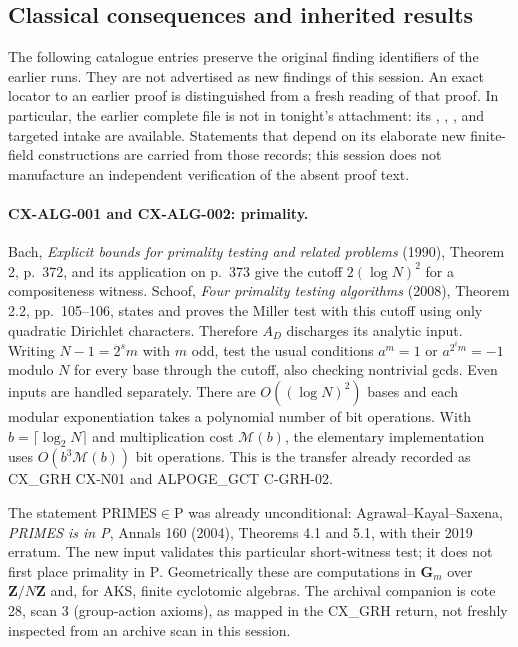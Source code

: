 \documentclass[11pt,a4paper]{article}
\begin{document}
\subsection{Classical consequences and inherited results}

The following catalogue entries preserve the original finding identifiers of
the earlier runs. They are not advertised as new findings of this session.
An exact locator to an earlier proof is distinguished from a fresh reading of
that proof. In particular, the earlier complete file  is
not in tonight's attachment: its , ,
, and targeted intake are available. Statements that depend
on its elaborate new finite-field constructions are carried from those records;
this session does not manufacture an independent verification of the absent
proof text.

\paragraph{CX-ALG-001 and CX-ALG-002: primality.}
Bach, \emph{Explicit bounds for primality testing and related problems}
(1990), Theorem 2, p.~372, and its application on p.~373 give the cutoff
$2(\log N)^2$ for a compositeness witness. Schoof, \emph{Four primality testing
algorithms} (2008), Theorem 2.2, pp.~105--106, states and proves the Miller test
with this cutoff using only quadratic Dirichlet characters. Therefore $A_D$
discharges its analytic input. Writing $N-1=2^s m$ with $m$ odd, test the usual
conditions $a^m=1$ or $a^{2^i m}=-1$ modulo $N$ for every base through the
cutoff, also checking nontrivial gcds. Even inputs are handled separately.
There are $O((\log N)^2)$ bases and each modular exponentiation takes a
polynomial number of bit operations. With $b=\lceil\log_2N\rceil$ and
multiplication cost $\mathcal M(b)$, the elementary implementation uses
$O(b^3\mathcal M(b))$ bit operations. This is the transfer already recorded
as CX\_GRH CX-N01 and ALPOGE\_GCT C-GRH-02.

The statement $\mathrm{PRIMES}\in\mathrm P$ was already unconditional:
Agrawal--Kayal--Saxena, \emph{PRIMES is in P}, Annals 160 (2004), Theorems 4.1
and 5.1, with their 2019 erratum. The new input validates this particular
short-witness test; it does not first place primality in $\mathrm P$.
Geometrically these are computations in $\mathbf G_m$ over $\mathbf Z/N\mathbf Z$
and, for AKS, finite cyclotomic algebras. The archival companion is cote 28,
scan 3 (group-action axioms), as mapped in the CX\_GRH return, not freshly
inspected from an archive scan in this session.
\end{document}
